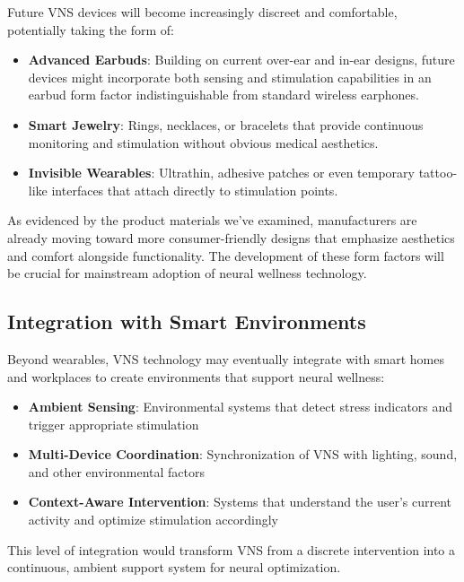 \documentclass[
  Letterpaper,
]{scrbook}
\providecommand{\tightlist}{%
  \setlength{\itemsep}{0pt}\setlength{\parskip}{0pt}}\usepackage{longtable,booktabs,array}
\begin{document}
Future VNS devices will become increasingly discreet and comfortable,
potentially taking the form of:

\begin{itemize}
\tightlist
\item
  \textbf{Advanced Earbuds}: Building on current over-ear and in-ear
  designs, future devices might incorporate both sensing and stimulation
  capabilities in an earbud form factor indistinguishable from standard
  wireless earphones.
\item
  \textbf{Smart Jewelry}: Rings, necklaces, or bracelets that provide
  continuous monitoring and stimulation without obvious medical
  aesthetics.
\item
  \textbf{Invisible Wearables}: Ultrathin, adhesive patches or even
  temporary tattoo-like interfaces that attach directly to stimulation
  points.
\end{itemize}

As evidenced by the product materials we've examined, manufacturers are
already moving toward more consumer-friendly designs that emphasize
aesthetics and comfort alongside functionality. The development of these
form factors will be crucial for mainstream adoption of neural wellness
technology.

\subsection{Integration with Smart
Environments}\label{integration-with-smart-environments}

Beyond wearables, VNS technology may eventually integrate with smart
homes and workplaces to create environments that support neural
wellness:

\begin{itemize}
\tightlist
\item
  \textbf{Ambient Sensing}: Environmental systems that detect stress
  indicators and trigger appropriate stimulation
\item
  \textbf{Multi-Device Coordination}: Synchronization of VNS with
  lighting, sound, and other environmental factors
\item
  \textbf{Context-Aware Intervention}: Systems that understand the
  user's current activity and optimize stimulation accordingly
\end{itemize}

This level of integration would transform VNS from a discrete
intervention into a continuous, ambient support system for neural
optimization.
\end{document}

